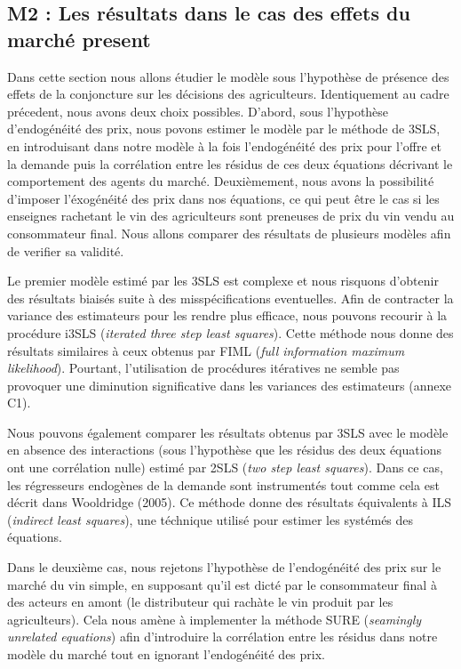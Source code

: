\documentclass[11pt,]{article}
\begin{document}
\hypertarget{m2-les-resultats-dans-le-cas-des-effets-du-marche-present}{%
\subsection{M2 : Les résultats dans le cas des effets du marché
present}\label{m2-les-resultats-dans-le-cas-des-effets-du-marche-present}}

Dans cette section nous allons étudier le modèle sous l'hypothèse de
présence des effets de la conjoncture sur les décisions des
agriculteurs. Identiquement au cadre précedent, nous avons deux choix
possibles. D'abord, sous l'hypothèse d'endogénéité des prix, nous povons
estimer le modèle par le méthode de 3SLS, en introduisant dans notre
modèle à la fois l'endogénéité des prix pour l'offre et la demande puis
la corrélation entre les résidus de ces deux équations décrivant le
comportement des agents du marché. Deuxièmement, nous avons la
possibilité d'imposer l'éxogénéité des prix dans nos équations, ce qui
peut être le cas si les enseignes rachetant le vin des agriculteurs sont
preneuses de prix du vin vendu au consommateur final. Nous allons
comparer des résultats de plusieurs modèles afin de verifier sa
validité.

Le premier modèle estimé par les 3SLS est complexe et nous risquons
d'obtenir des résultats biaisés suite à des misspécifications
eventuelles. Afin de contracter la variance des estimateurs pour les
rendre plus efficace, nous pouvons recourir à la procédure i3SLS
(\emph{iterated three step least squares}). Cette méthode nous donne des
résultats similaires à ceux obtenus par FIML (\emph{full information
maximum likelihood}). Pourtant, l'utilisation de procédures itératives
ne semble pas provoquer une diminution significative dans les variances
des estimateurs (annexe C1).

Nous pouvons également comparer les résultats obtenus par 3SLS avec le
modèle en absence des interactions (sous l'hypothèse que les résidus des
deux équations ont une corrélation nulle) estimé par 2SLS (\emph{two
step least squares}). Dans ce cas, les régresseurs endogènes de la
demande sont instrumentés tout comme cela est décrit dans Wooldridge
(2005). Ce méthode donne des résultats équivalents à ILS (\emph{indirect
least squares}), une téchnique utilisé pour estimer les systémés des
équations.

Dans le deuxième cas, nous rejetons l'hypothèse de l'endogénéité des
prix sur le marché du vin simple, en supposant qu'il est dicté par le
consommateur final à des acteurs en amont (le distributeur qui rachàte
le vin produit par les agriculteurs). Cela nous amène à implementer la
méthode SURE (\emph{seamingly unrelated equations}) afin d'introduire la
corrélation entre les résidus dans notre modèle du marché tout en
ignorant l'endogénéité des prix.
\end{document}

